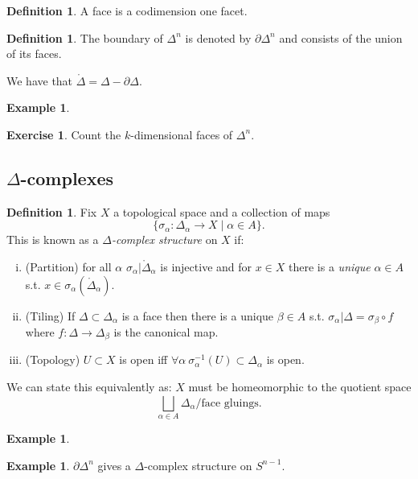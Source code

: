 \documentclass[12pt]{article}
\theoremstyle{definition}
\theoremstyle{definition}
\newtheorem{defn}[thm]{Definition}
\newtheorem{ex}[thm]{Example}
\newtheorem*{exer}{Exercise}
\begin{document}
\begin{defn}
A face is a codimension one facet.
\end{defn}

\begin{defn}
The boundary of $\Delta^n$ is denoted by $\partial \Delta^n$ and consists of the union of its faces.
\end{defn}

We have that $\mathring{\Delta} =\Delta - \partial \Delta$.

\begin{ex}
\end{ex}

\begin{exer}
Count the $k$-dimensional faces of $\Delta^n$.
\end{exer}

\subsection{$\Delta$-complexes}
\begin{defn}
Fix $X$ a topological space and a collection of maps
\[\{\sigma_\alpha \colon \Delta_\alpha \to X \mid \alpha \in A\}.\]
This is known as a \emph{$\Delta$-complex structure} on $X$ if:
\begin{enumerate}[(i)]
\item (Partition) for all $\alpha$ $\sigma_\alpha|\mathring{\Delta}_\alpha$ is injective and for $x\in X$ there is a \emph{unique} $\alpha\in A$ s.t. $x\in\sigma_\alpha(\mathring{\Delta}_\alpha)$.
\item (Tiling) If $\Delta\subset \Delta_\alpha$ is a face then there is a unique $\beta\in A$ s.t. $\sigma_\alpha|\Delta = \sigma_\beta\circ f$ where $f \colon \Delta \to \Delta_\beta$ is the canonical map.
\item (Topology) $U\subset X$ is open iff $\forall \alpha\ \sigma^{-1}_\alpha (U) \subset \Delta_\alpha$ is open.
\end{enumerate}
\end{defn}

We can state this equivalently as: $X$ must be homeomorphic to the quotient space
\[\bigsqcup_{\alpha\in A} \Delta_\alpha / \text{face gluings}.\]

\begin{ex}
\end{ex}

\begin{ex}
$\partial \Delta^n$ gives a $\Delta$-complex structure on $S^{n-1}$.
\end{ex}
\end{document}
